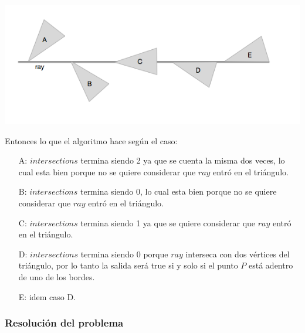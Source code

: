 \centerline{\includegraphics[scale=0.7]{img/ej36.png}}

Entonces lo que el algoritmo hace según el caso:
\begin{itemize}
\item[A:] $intersections$ termina siendo 2 ya que se cuenta la misma dos veces, lo cual esta bien porque
no se quiere considerar que $ray$ entró en el triángulo.
\item[B:] $intersections$ termina siendo 0, lo cual esta bien porque
no se quiere considerar que $ray$ entró en el triángulo.
\item[C:] $intersections$ termina siendo 1 ya que se quiere considerar que $ray$ entró en el triángulo.
\item[D:] $intersections$ termina siendo 0 porque $ray$ interseca con dos vértices del triángulo, por lo
tanto la salida será true si y solo si el punto $P$ está adentro de uno de los bordes.
\item[E:] idem caso D.
\end{itemize}

\subsubsection{Resolución del problema}

